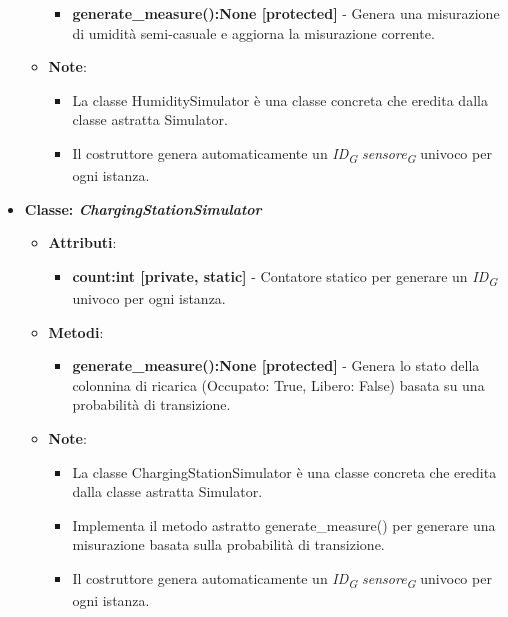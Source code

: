 \begin{itemize}
\begin{itemize}
    \begin{itemize}
        \item \textbf{generate\_measure():None [protected]} - Genera una misurazione di umidità semi-casuale e aggiorna la misurazione corrente.
    \end{itemize}
    \item \textbf{Note}:
    \begin{itemize}
        \item La classe HumiditySimulator è una classe concreta che eredita dalla classe astratta Simulator.
        \item Il costruttore genera automaticamente un \textit{ID}\textsubscript{\textit{G}} \textit{sensore}\textsubscript{\textit{G}} univoco per ogni istanza.
    \end{itemize}
\end{itemize}
    \item{\textbf{Classe: \textit{ChargingStationSimulator}}}
    \begin{itemize}
        \item  \textbf{Attributi}: 
    \begin{itemize}
        \item \textbf{count:int [private, static]} - Contatore statico per generare un \textit{ID}\textsubscript{\textit{G}} univoco per ogni istanza.
    \end{itemize}
    \item  \textbf{Metodi}:
    \begin{itemize}
        \item \textbf{generate\_measure():None [protected]} - Genera lo stato della colonnina di ricarica (Occupato: True, Libero: False) basata su una probabilità di transizione.
    \end{itemize}
    \item   \textbf{Note}:
    \begin{itemize}
        \item La classe ChargingStationSimulator è una classe concreta che eredita dalla classe astratta Simulator.
        \item Implementa il metodo astratto generate\_measure() per generare una misurazione basata sulla probabilità di transizione.
        \item Il costruttore genera automaticamente un \textit{ID}\textsubscript{\textit{G}} \textit{sensore}\textsubscript{\textit{G}} univoco per ogni istanza.
    \end{itemize}
\end{itemize}

\end{itemize}
